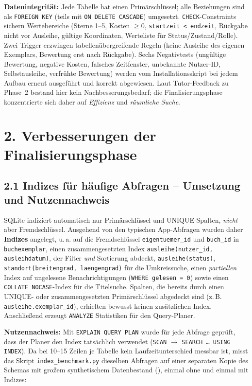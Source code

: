 \documentclass[11pt,a4paper]{article}
\begin{document}
\textbf{Datenintegrität:} Jede Tabelle hat einen Primärschlüssel; alle Beziehungen sind als \texttt{FOREIGN KEY} (teils mit \texttt{ON DELETE CASCADE}) umgesetzt. \texttt{CHECK}-Constraints sichern Wertebereiche (Sterne 1--5, Kosten $\geq 0$, \texttt{startzeit < endzeit}, Rückgabe nicht vor Ausleihe, gültige Koordinaten, Werteliste für Status/Zustand/Rolle). Zwei Trigger erzwingen tabellenübergreifende Regeln (keine Ausleihe des eigenen Exemplars, Bewertung erst nach Rückgabe). Sechs Negativtests (ungültige Bewertung, negative Kosten, falsches Zeitfenster, unbekannte Nutzer-ID, Selbstausleihe, verfrühte Bewertung) werden vom Installationsskript bei jedem Aufbau erneut ausgeführt und korrekt abgewiesen. Laut Tutor-Feedback zu Phase~2 bestand hier kein Nachbesserungsbedarf; die Finalisierungsphase konzentrierte sich daher auf \emph{Effizienz} und \emph{räumliche Suche}.

\section*{2. Verbesserungen der Finalisierungsphase}
\subsection*{2.1 Indizes für häufige Abfragen -- Umsetzung und Nutzennachweis}
SQLite indiziert automatisch nur Primärschlüssel und UNIQUE-Spalten, \emph{nicht} aber Fremdschlüssel. Ausgehend von den typischen App-Abfragen wurden daher \textbf{\mdIndizes{} Indizes} angelegt, u.\,a. auf die Fremdschlüssel \texttt{eigentuemer\_id} und \texttt{buch\_id} in \texttt{buchexemplar}, einen zusammengesetzten Index \texttt{ausleihe(nutzer\_id, ausleihdatum)}, der Filter \emph{und} Sortierung abdeckt, \texttt{ausleihe(status)}, \texttt{standort(breitengrad, laengengrad)} für die Umkreissuche, einen \emph{partiellen} Index auf ungelesene Benachrichtigungen (\texttt{WHERE gelesen = 0}) sowie einen \texttt{COLLATE NOCASE}-Index für die Titelsuche. Spalten, die bereits durch einen UNIQUE- oder zusammengesetzten Primärschlüssel abgedeckt sind (z.\,B. \texttt{ausleihe.exemplar\_id}), erhielten bewusst keinen zusätzlichen Index. Anschließend erzeugt \texttt{ANALYZE} Statistiken für den Query-Planer.

\textbf{Nutzennachweis:} Mit \texttt{EXPLAIN QUERY PLAN} wurde für jede Abfrage geprüft, dass der Planer den Index tatsächlich verwendet (\texttt{SCAN} $\rightarrow$ \texttt{SEARCH \dots{} USING INDEX}). Da bei 10--15 Zeilen je Tabelle kein Laufzeitunterschied messbar ist, misst das Skript \texttt{index\_benchmark.py} dieselben Abfragen auf einer separaten Kopie des Schemas mit großem synthetischem Datenbestand (\benchmeta), einmal ohne und einmal mit Indizes:
\end{document}
